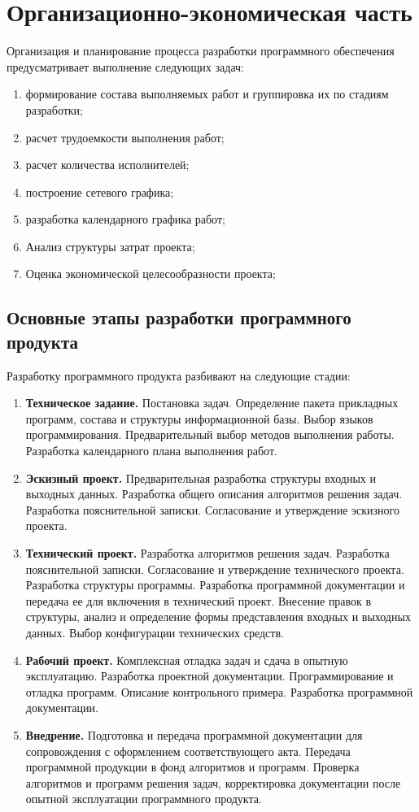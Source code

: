 \chapter{Организационно-экономическая часть}
Организация и планирование процесса разработки программного обеспечения предусматривает выполнение следующих задач:
\begin{enumerate}[1.]
\item формирование состава выполняемых работ и группировка их по стадиям разработки;
\item расчет трудоемкости выполнения работ;
\item расчет количества исполнителей;
\item построение сетевого графика;
\item разработка календарного графика работ;
\item Анализ структуры затрат проекта;
\item Оценка экономической целесообразности проекта;
\end{enumerate}

\section{Основные этапы разработки программного продукта}
Разработку программного продукта разбивают на следующие стадии:
\begin{enumerate}[1.]
\item \textbf{Техническое задание.} Постановка задач. Определение пакета прикладных программ, состава и структуры информационной базы. Выбор языков программирования. Предварительный выбор методов выполнения работы. Разработка календарного плана выполнения работ.
\item \textbf{Эскизный проект.} Предварительная разработка структуры входных и выходных данных. Разработка общего описания алгоритмов решения задач. Разработка пояснительной записки. Согласование и утверждение эскизного проекта.
\item \textbf{Технический проект.} Разработка алгоритмов решения задач. Разработка пояснительной записки. Согласование и утверждение технического проекта. Разработка структуры программы. Разработка программной документации и передача ее для включения в технический проект. Внесение правок в структуры, анализ и определение формы представления входных и выходных данных. Выбор конфигурации технических средств.
\item \textbf{Рабочий проект.} Комплексная отладка задач и сдача в опытную эксплуатацию. Разработка проектной документации. Программирование и отладка программ. Описание контрольного примера. Разработка программной документации. 
\item \textbf{Внедрение.} Подготовка и передача программной документации для сопровождения с оформлением соответствующего акта. Передача программной продукции в фонд алгоритмов и программ. Проверка алгоритмов и программ решения задач, корректировка документации после опытной эксплуатации программного продукта.
\end{enumerate}

